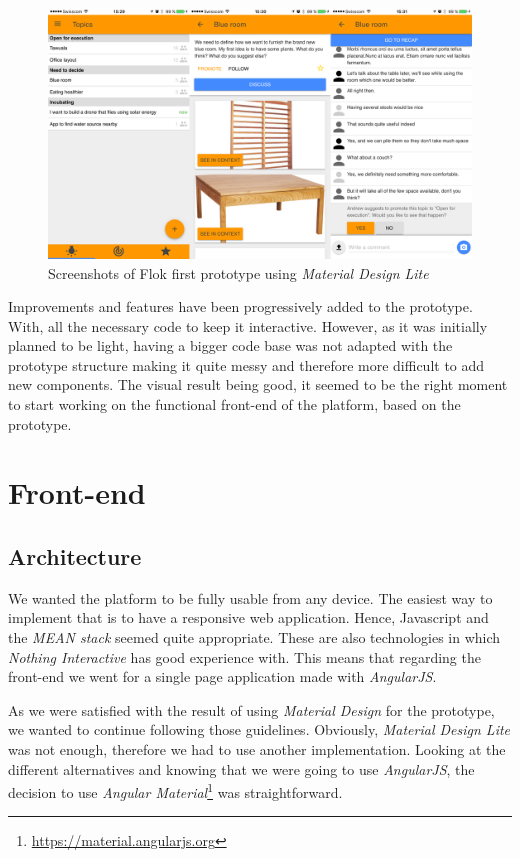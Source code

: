 \documentclass[a4paper,12pt, oneside]{article}
\begin{document}
\begin{figure}[!htb]
\centering
\includegraphics[width=\textwidth]{images/firstPrototypeScreenshots.png}
\caption{Screenshots of Flok first prototype using \emph{Material Design Lite}}
\label{fig.firstPrototypeScreenshots}
\end{figure}

Improvements and features have been progressively added to the prototype.
With, all the necessary code to keep it interactive.
However, as it was initially planned to be light, having a bigger code base was not adapted with the prototype structure making it quite messy and therefore more difficult to add new components.
The visual result being good, it seemed to be the right moment to start working on the functional front-end of the platform, based on the prototype.

\section{Front-end}
\subsection{Architecture}
We wanted the platform to be fully usable from any device.
The easiest way to implement that is to have a responsive web application.
Hence, Javascript and the \emph{MEAN stack} seemed quite appropriate.
These are also technologies in which \emph{Nothing Interactive} has good experience with.
This means that regarding the front-end we went for a single page application made with \emph{AngularJS}.

As we were satisfied with the result of using \emph{Material Design} for the prototype, we wanted to continue following those guidelines.
Obviously, \emph{Material Design Lite} was not enough, therefore we had to use another implementation.
Looking at the different alternatives and knowing that we were going to use \emph{AngularJS}, the decision to use \emph{Angular Material}\footnote{\url{https://material.angularjs.org}} was straightforward.
\end{document}
